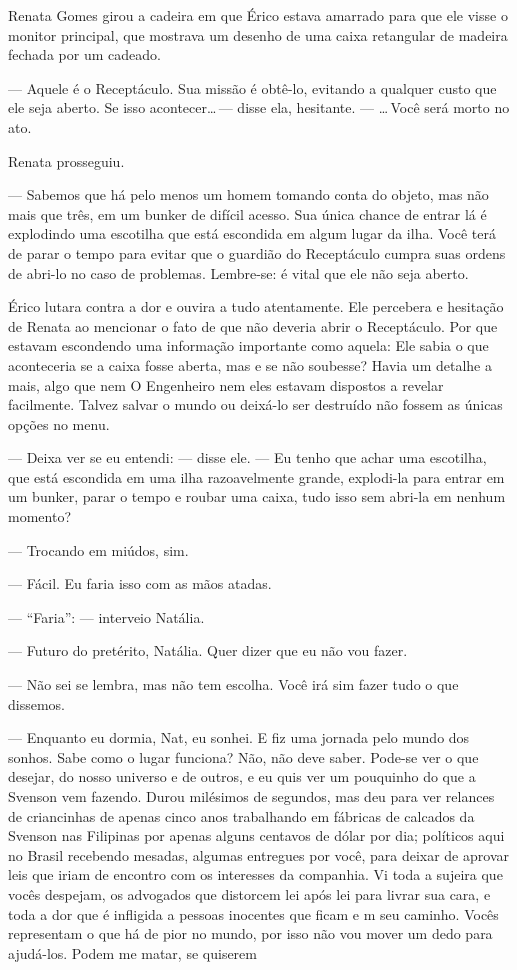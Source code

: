 Renata Gomes girou a cadeira em que Érico estava amarrado para que ele
visse o monitor principal, que mostrava um desenho de uma caixa
retangular de madeira fechada por um cadeado.

--- Aquele é o Receptáculo. Sua missão é obtê-lo, evitando a qualquer
custo que ele seja aberto. Se isso acontecer\ldots\,--- disse ela,
hesitante. --- \ldots\,Você será morto no ato.

Renata prosseguiu.

--- Sabemos que há pelo menos um homem tomando conta do objeto, mas não
mais que três, em um bunker de difícil acesso. Sua única chance de
entrar lá é explodindo uma escotilha que está escondida em algum lugar
da ilha. Você terá de parar o tempo para evitar que o guardião do
Receptáculo cumpra suas ordens de abri-lo no caso de problemas.
Lembre-se: é vital que ele não seja aberto.

Érico lutara contra a dor e ouvira a tudo atentamente. Ele percebera e
hesitação de Renata ao mencionar o fato de que não deveria abrir o
Receptáculo. Por que estavam escondendo uma informação importante como
aquela: Ele sabia o que aconteceria se a caixa fosse aberta, mas e se
não soubesse? Havia um detalhe a mais, algo que nem O Engenheiro nem
eles estavam dispostos a revelar facilmente. Talvez salvar o mundo ou
deixá-lo ser destruído não fossem as únicas opções no menu.

--- Deixa ver se eu entendi: --- disse ele. --- Eu tenho que achar uma
escotilha, que está escondida em uma ilha razoavelmente grande,
explodi-la para entrar em um bunker, parar o tempo e roubar uma caixa,
tudo isso sem abri-la em nenhum momento?

--- Trocando em miúdos, sim.

--- Fácil. Eu faria isso com as mãos atadas.

--- “Faria”: --- interveio Natália.

--- Futuro do pretérito, Natália. Quer dizer que eu não vou fazer.

--- Não sei se lembra, mas não tem escolha. Você irá sim fazer tudo o
que dissemos.

--- Enquanto eu dormia, Nat, eu sonhei. E fiz uma jornada pelo mundo dos
sonhos. Sabe como o lugar funciona? Não, não deve saber. Pode-se ver o
que desejar, do nosso universo e de outros, e eu quis ver um pouquinho
do que a Svenson vem fazendo. Durou milésimos de segundos, mas deu para
ver relances de criancinhas de apenas cinco anos trabalhando em 
fábricas de calcados da Svenson nas Filipinas por apenas alguns 
centavos de dólar por dia; políticos aqui no Brasil recebendo mesadas, 
algumas entregues por você, para deixar de aprovar leis que iriam de 
encontro com os interesses da companhia. Vi toda a sujeira que vocês 
despejam, os advogados que distorcem lei após lei para livrar sua 
cara, e toda a dor que é infligida a pessoas inocentes que ficam e m
seu caminho. Vocês representam o que há de pior no mundo, por isso não 
vou mover um dedo para ajudá-los. Podem me matar, se quiserem 

